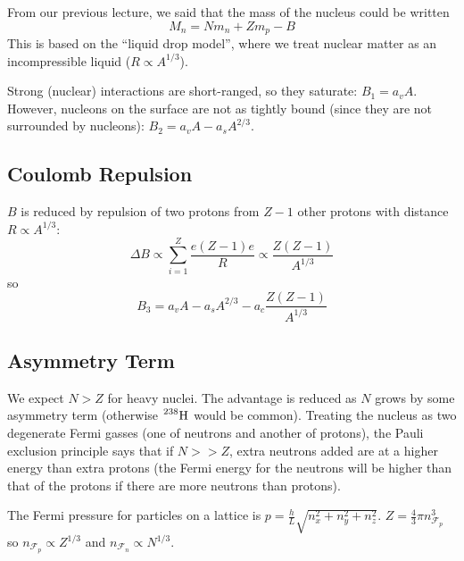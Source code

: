 \documentclass[a4paper,twoside,master.tex]{subfiles}
\begin{document}

From our previous lecture, we said that the mass of the nucleus could be written
\begin{equation}
    M_n = N m_n + Z m_p - B
\end{equation}
This is based on the ``liquid drop model'', where we treat nuclear matter as an incompressible liquid ($ R \propto A^{1/3} $).

Strong (nuclear) interactions are short-ranged, so they saturate: $ B_1 = a_v A $. However, nucleons on the surface are not as tightly bound (since they are not surrounded by nucleons): $ B_2 = a_v A - a_s A^{2/3} $.

\subsection{Coulomb Repulsion}\label{sub:coulomb_repulsion}

$ B $ is reduced by repulsion of two protons from $ Z - 1 $ other protons with distance $ R \propto A^{1/3} $:
\begin{equation}
    \Delta B \propto \sum_{i=1}^{Z} \frac{e(Z-1)e}{R} \propto \frac{Z(Z-1)}{A^{1/3}}
\end{equation}
so
\begin{equation}
    B_3 = a_v A - a_s A^{2/3} - a_c \frac{Z(Z-1)}{A^{1/3}}
\end{equation}

\subsection{Asymmetry Term}\label{sub:asymmetry_term}

We expect $ N > Z $ for heavy nuclei. The advantage is reduced as $ N $ grows by some asymmetry term (otherwise $ \nuclide[238]{H} $ would be common). Treating the nucleus as two degenerate Fermi gasses (one of neutrons and another of protons), the Pauli exclusion principle says that if $ N >> Z $, extra neutrons added are at a higher energy than extra protons (the Fermi energy for the neutrons will be higher than that of the protons if there are more neutrons than protons).

The Fermi pressure for particles on a lattice is $ p = \frac{h}{L} \sqrt{n_x^2 + n_y^2 + n_z^2} $. $ Z = \frac{4}{3} \pi n^3_{\mathcal{F}_p} $ so $ n_{\mathcal{F}_p} \propto Z^{1/3} $ and $ n_{\mathcal{F}_n} \propto N^{1/3} $.
\end{document}
